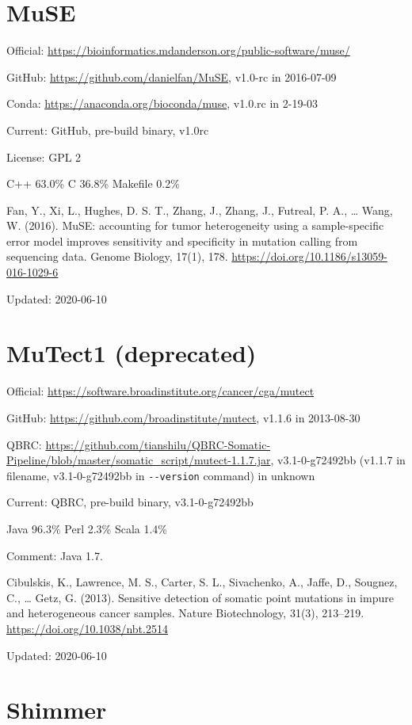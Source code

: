 \documentclass[]{article}
\begin{document}
\section{MuSE}

Official: \url{https://bioinformatics.mdanderson.org/public-software/muse/}

GitHub: \url{https://github.com/danielfan/MuSE}, v1.0-rc in 2016-07-09

Conda: \url{https://anaconda.org/bioconda/muse}, v1.0.rc in 2-19-03

Current: GitHub, pre-build binary, v1.0rc

License: GPL 2

C++ 63.0\% C 36.8\% Makefile 0.2\%

Fan, Y., Xi, L., Hughes, D. S. T., Zhang, J., Zhang, J., Futreal, P. A., … Wang, W. (2016). MuSE: accounting for tumor heterogeneity using a sample-specific error model improves sensitivity and specificity in mutation calling from sequencing data. Genome Biology, 17(1), 178. \url{https://doi.org/10.1186/s13059-016-1029-6}

Updated: 2020-06-10

\section{MuTect1 (deprecated)}

Official: \url{https://software.broadinstitute.org/cancer/cga/mutect}

GitHub: \url{https://github.com/broadinstitute/mutect}, v1.1.6 in 2013-08-30

QBRC: \url{https://github.com/tianshilu/QBRC-Somatic-Pipeline/blob/master/somatic_script/mutect-1.1.7.jar}, v3.1-0-g72492bb (v1.1.7 in filename, v3.1-0-g72492bb in \verb|--version| command) in unknown

Current: QBRC, pre-build binary, v3.1-0-g72492bb

Java 96.3\% Perl 2.3\% Scala 1.4\%

Comment: Java 1.7.

Cibulskis, K., Lawrence, M. S., Carter, S. L., Sivachenko, A., Jaffe, D., Sougnez, C., … Getz, G. (2013). Sensitive detection of somatic point mutations in impure and heterogeneous cancer samples. Nature Biotechnology, 31(3), 213–219. \url{https://doi.org/10.1038/nbt.2514}

Updated: 2020-06-10

\section{Shimmer}
\end{document}
